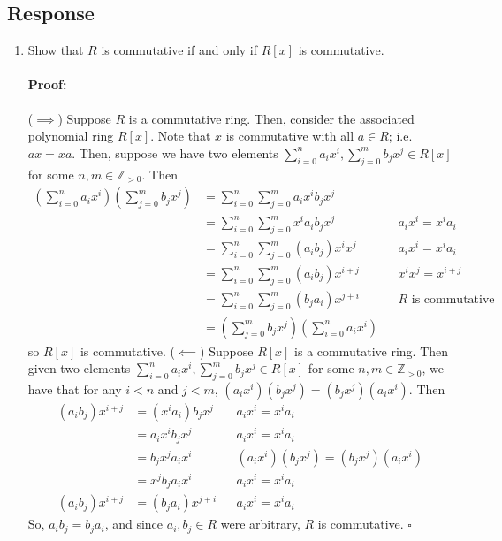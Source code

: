 \documentclass [12pt] {article}
\newcommand{\Z}{\mathbb{Z}}
\newenvironment{proof}{\paragraph{Proof:}}{\hfill$\square$}
\begin{document}
\subsection*{Response}
\begin{enumerate}
    \item Show that $R$ is commutative if and only if $R[x]$ is commutative. \vspace{-12pt}

        \begin{proof}
            ($\implies$) Suppose $R$ is a commutative ring. Then, consider the associated 
            polynomial ring $R[x]$. Note that $x$ is commutative with all $a \in R$; i.e. $ax = xa$.
            Then, suppose we have two elements $\sum^{n}_{i = 0} a_i x^i, \sum^{m}_{j = 0} b_j x^j \in R[x]$
            for some $n, m \in \Z_{> 0}$. Then
            \begin{align*}
                \left( \sum^{n}_{i = 0} a_i x^i \right) \left( \sum^{m}_{j = 0} b_j x^j \right)
                &= \sum^{n}_{i = 0} \sum^{m}_{j = 0} a_i x^i b_j x^j \\
                &= \sum^{n}_{i = 0} \sum^{m}_{j = 0} x^i a_i b_j x^j && a_i x^i = x^i a_i \\
                &= \sum^{n}_{i = 0} \sum^{m}_{j = 0} (a_i b_j) x^i x^j && a_i x^i = x^i a_i \\
                &= \sum^{n}_{i = 0} \sum^{m}_{j = 0} (a_i b_j) x^{i + j} && x^i x^j = x^{i + j} \\
                &= \sum^{n}_{i = 0} \sum^{m}_{j = 0} (b_j a_i) x^{j + i} 
                && R \text{ is commutative} \\
                &= \left( \sum^{m}_{j = 0} b_j x^j \right) \left( \sum^{n}_{i = 0} a_i x^i \right)
            \end{align*}
            so $R[x]$ is commutative.
            \newline
            ($\impliedby$) Suppose $R[x]$ is a commutative ring. Then given two elements
            $\sum^{n}_{i = 0} a_i x^i, \sum^{m}_{j = 0} b_j x^j \in R[x]$ for some $n, m \in \Z_{> 0}$,
            we have that for any $i < n$ and $j < m$, $(a_i x^i)(b_j x^j) = (b_j x^j)(a_i x^i)$. 
            Then
            \begin{align*}
                (a_i b_j) x^{i + j} 
                &= (x^i a_i) b_j x^j && a_i x^i = x^i a_i \\ 
                &= a_i x^i b_j x^j && a_i x^i = x^i a_i \\
                &= b_j x^j a_i x^i && (a_i x^i)(b_j x^j) = (b_j x^j)(a_i x^i) \\
                &= x^j b_j a_i x^i && a_i x^i = x^i a_i \\
                (a_i b_j) x^{i + j} 
                &= (b_j a_i) x^{j + i} && a_i x^i = x^i a_i
            \end{align*}
            So, $a_i b_j = b_j a_i$, and since $a_i, b_j \in R$ were arbitrary, $R$ is commutative.
        \end{proof}


\end{enumerate}
\end{document}
